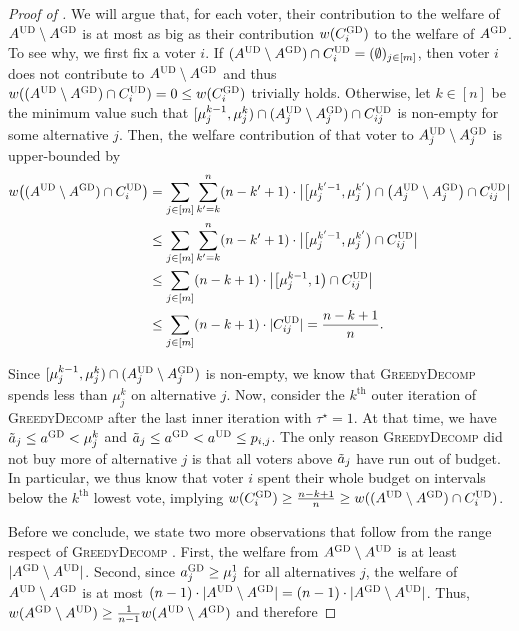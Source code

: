 \documentclass[11pt]{article}
\newcommand{\optd}{\textsc{UD}}
\newcommand{\GrdDec}{\textsc{GreedyDecomp} }
\newcommand{\GrdDecs}{\textsc{GD} }%
\begin{document}
\begin{proof}[Proof of ]
    We will argue that, for each voter, their contribution to the welfare of $A^\optd \setminus A^\GrdDecs$ is at most as big as their contribution $w(C^\GrdDecs_i)$ to the welfare of $A^\GrdDecs$. 
    To see why, we first fix a voter $i$. If $(A^\optd \setminus A^\GrdDecs) \cap C^\optd_i = (\emptyset)_{j \in [m]}$, then voter $i$ does not contribute to $A^\optd \setminus A^\GrdDecs$ and thus $w((A^\optd \setminus A^\GrdDecs) \cap C^\optd_i) = 0 \le w(C^\GrdDecs_i)$ trivially holds. Otherwise, let $k \in [n]$ be the minimum value such that $[\mu^{k-1}_j, \mu^k_j) \cap (A^\optd_j \setminus A^\GrdDecs_j) \cap C^\optd_{ij}$ is non-empty for some alternative $j$. Then, the welfare contribution of that voter to $A^\optd_j \setminus A^\GrdDecs_j$ is upper-bounded by 
    \begin{align*}
        w\big((A^\optd \setminus A^\GrdDecs) \cap C^\optd_i\big) 
        &= \sum_{j \in [m]} \sum_{k' = k}^{n} (n-k'+1) \cdot \big|\big[\mu^{k'-1}_j, \mu^{k'}_j\big) \cap \big(A^\optd_j \setminus A^\GrdDecs_j\big) \cap C^\optd_{ij}\big| \\
        &\le \sum_{j \in [m]} \sum_{k' = k}^{n} (n-k'+1) \cdot \big|\big[\mu^{k'-1}_j, \mu^{k'}_j\big) \cap C^\optd_{ij}\big| \\
        &\le \sum_{j \in [m]} (n-k+1) \cdot \big|\big[\mu^{k-1}_j, 1\big) \cap C^\optd_{ij}\big| \\
        &\le \sum_{j \in [m]} (n-k+1) \cdot |C^\optd_{ij}| = \frac{n-k+1}{n}.    
    \end{align*}

    Since $[\mu^{k-1}_j, \mu^k_j) \cap (A^\optd_j \setminus A^\GrdDecs_j)$ is non-empty, we know that \GrdDec spends less than $\mu^k_j$ on alternative $j$.  
    Now, consider the $k^\text{th}$ outer iteration of \GrdDec after the last inner iteration with $\tau^\star=1$. At that time, we have $\Tilde{a}_j \le a^\GrdDecs < \mu^k_j$ and $\Tilde{a}_j \le a^\GrdDecs < a^\optd \le p_{i,j}$. The only reason \GrdDec did not buy more of alternative $j$ is that all voters above $\Tilde{a}_j$ have run out of budget. In particular, we thus know that voter $i$ spent their whole budget on intervals below the $k^\text{th}$ lowest vote, implying $w(C^\GrdDecs_i) \ge \frac{n-k+1}{n} \ge w((A^\optd\setminus A^\GrdDecs) \cap C^\optd_i)$.

    Before we conclude, we state two more observations that follow from the range respect of \GrdDec. First, the welfare from $A^\GrdDecs \setminus A^\optd$ is at least $|A^\GrdDecs \setminus A^\optd|$. Second, since $a^\GrdDecs_j \ge \mu^1_j$ for all alternatives $j$, the welfare of $A^\optd \setminus A^\GrdDecs$ is at most $(n-1) \cdot |A^\optd \setminus A^\GrdDecs| = (n-1) \cdot |A^\GrdDecs \setminus A^\optd|$.
    Thus, $w(A^\GrdDecs \setminus A^\optd) \ge \frac{1}{n-1} w(A^\optd \setminus A^\GrdDecs)$ and therefore
    

\end{proof}
\end{document}
